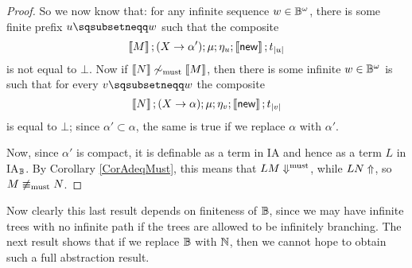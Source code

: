 \documentclass{article}
\begin{document}
\begin{proof}
  So we now know that: for any infinite sequence $w\in \mathbb{B}^\omega$, there is some finite prefix $u\pprefix w$ such that the composite
  \[
    \left\llbracket M\right\rrbracket;(X \to \alpha');\mu;\eta_u;\left\llbracket\operatorname{{\mathsf{new}}}\right\rrbracket;t_{|u|}
    \]
  is not equal to $\bot$.  
  Now if $\left\llbracket N\right\rrbracket\not\sim_{\operatorname{must}}\left\llbracket M\right\rrbracket$, then there is some infinite $w\in \mathbb{B}^\omega$ is such that for every $v\pprefix w$ the composite
  \[
    \left\llbracket N\right\rrbracket;(X \to \alpha);\mu;\eta_v;\left\llbracket\operatorname{{\mathsf{new}}}\right\rrbracket;t_{|v|}
    \]
  is equal to $\bot$; since $\alpha'\subset \alpha$, the same is true if we replace $\alpha$ with $\alpha'$.

  Now, since $\alpha'$ is compact, it is definable as a term in IA and hence as a term $L$ in IA${}_{\mathbb{B}}$.  
  By Corollary \ref{CorAdeqMust}, this means that $L M \Downarrow^{\text{must}}$, while $L N\Uparrow$, so $M\not\equiv_{\operatorname{must}}N$.
\end{proof}

Now clearly this last result depends on finiteness of $\mathbb{B}$, since we may have infinite trees with no infinite path if the trees are allowed to be infinitely branching.
The next result shows that if we replace $\mathbb{B}$ with $\mathbb{N}$, then we cannot hope to obtain such a full abstraction result.
\end{document}
